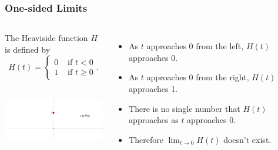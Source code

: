\begin{frame}
\frametitle{One-sided Limits}
\begin{example}[Example 6, p. 99]
\begin{columns}[c]
The Heaviside function $H$ is defined by
\[
H(t) = \left\{ \begin{array}{lr}
0 & \textrm{ if } t < 0\\
1 & \textrm{ if } t \geq 0
\end{array}\right. .
\]
\ \includegraphics[height=2.5cm]{limits/pictures/02-02-ex6.pdf}%
\begin{itemize}
\item<2->  As $t$ approaches $0$ from the left, $H(t)$ approaches 0.
\item<3->  As $t$ approaches $0$ from the right, $H(t)$ approaches 1.
\item<4->  There is no single number that $H(t)$ approaches as $t$ approaches 0.
\item<5->  Therefore $\lim_{t\rightarrow 0} H(t)$ doesn't exist.
\end{itemize}
\end{columns}
\end{example}
\end{frame}
